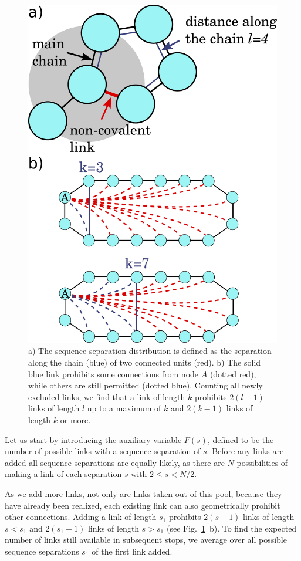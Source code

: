 \documentclass[
reprint,
twocolumn,
amsmath,amssymb,superscriptaddress,aps,
pre]{revtex4-1}
\begin{document}
\begin{figure}[h]
    \centering
    \includegraphics[width=0.7\columnwidth]{figures/Fig1.pdf}
    \caption{a) The sequence separation distribution is defined as the separation along the chain (blue) of two connected units (red). b) The solid blue link prohibits some connections from node $A$ (dotted red), while others are still permitted (dotted blue). Counting all newly excluded links, we find that a link of length $k$ prohibits $2(l-1)$ links of length $l$ up to a maximum of $k$ and $2(k-1)$ links of length $k$ or more.}
    \label{fig:schematic}
\end{figure}

Let us start by introducing the auxiliary variable $F(s)$, defined to be the number of possible links with a sequence separation of $s$. Before any links are added all sequence separations are equally likely, as there are $N$ possibilities of making a link of each separation $s$ with $2\leq s < N/2$.

As we add more links, not only are links taken out of this pool, because they have already been realized, each existing link can also geometrically prohibit other connections. Adding a link of length $s_1$ prohibits $2(s-1)$ links of length $s<s_1$ and $2(s_1-1)$ links of length $s>s_1$ (see Fig.~\ref{fig:schematic}~b). To find the expected number of links still available in subsequent stops, we average over all possible sequence separations $s_1$ of the first link added.
\end{document}
